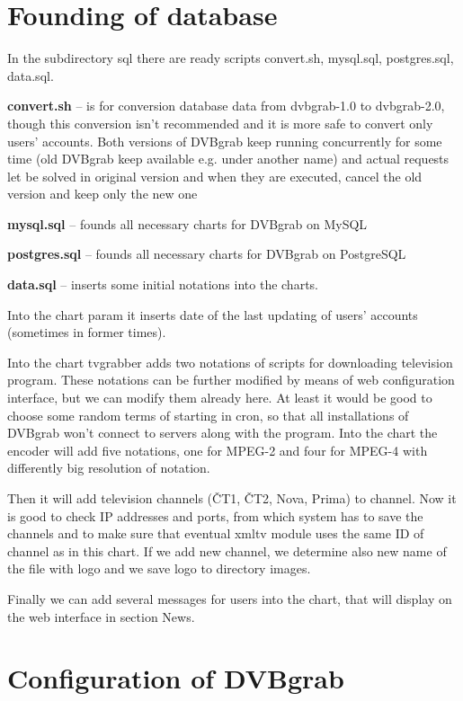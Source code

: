 \section{Founding of database}

In the subdirectory sql there are ready scripts convert.sh, mysql.sql, postgres.sql, data.sql.
\bitem
\item\textbf{convert.sh} -- is for conversion database data from dvbgrab-1.0 to dvbgrab-2.0, though this conversion isn't recommended and it is more safe to convert only users' accounts. Both versions of DVBgrab keep running concurrently for some time (old DVBgrab keep available e.g. under another name) and actual requests let be solved in original version and when they are executed, cancel the old version and keep only the new one
\item\textbf{mysql.sql} -- founds all necessary charts for DVBgrab on MySQL
\item\textbf{postgres.sql} -- founds all necessary charts for DVBgrab on PostgreSQL
\item\textbf{data.sql} -- inserts some initial notations into the charts. 
\eitem

Into the chart param it inserts date of the last updating of users' accounts (sometimes in former times). 

Into the chart tvgrabber adds two notations of scripts for downloading television program. These notations can be further modified by means of web configuration interface, but we can modify them already here. At least it would be good to choose some random terms of starting in cron, so that all installations of DVBgrab won't connect to servers along with the program. Into the chart the encoder will add five notations, one for MPEG-2 and four for MPEG-4 with differently big resolution of notation.

Then it will add television channels (ČT1, ČT2, Nova, Prima) to channel. Now it is good to check IP addresses and ports, from which system has to save the channels and to make sure that eventual xmltv module uses the same ID of channel as in this chart. If we add new channel, we determine also new name of the file with logo and we save logo to directory images.

Finally we can add several messages for users into the chart, that will display on the web interface in section News.

\section{Configuration of DVBgrab}

